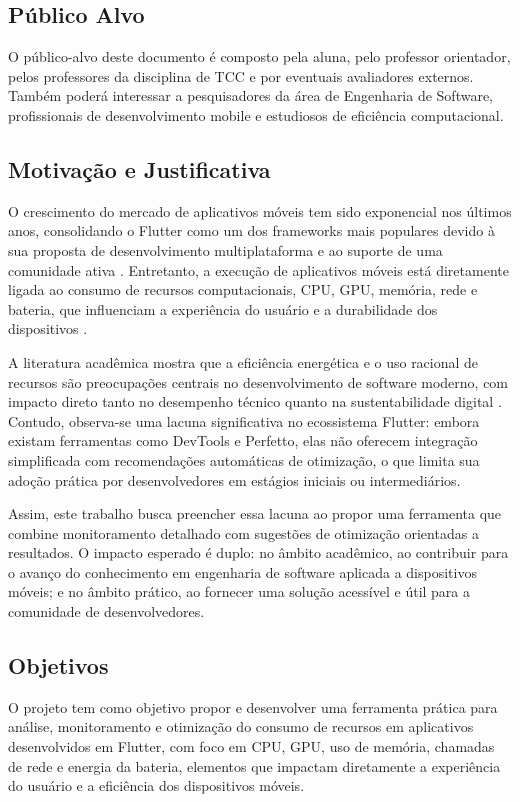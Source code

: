 \documentclass[12pt,a4paper]{article}
\begin{document}
\subsection{Público Alvo}
O público-alvo deste documento é composto pela aluna, pelo professor orientador, pelos professores da disciplina de TCC e por eventuais avaliadores externos. Também poderá interessar a pesquisadores da área de Engenharia de Software, profissionais de desenvolvimento mobile e estudiosos de eficiência computacional.

\subsection{Motivação e Justificativa}
O crescimento do mercado de aplicativos móveis tem sido exponencial nos últimos anos, consolidando o Flutter como um dos frameworks mais populares devido à sua proposta de desenvolvimento multiplataforma e ao suporte de uma comunidade ativa \cite{flutter}. Entretanto, a execução de aplicativos móveis está diretamente ligada ao consumo de recursos computacionais, CPU, GPU, memória, rede e bateria, que influenciam a experiência do usuário e a durabilidade dos dispositivos \cite{energy, monitoring}.  

A literatura acadêmica mostra que a eficiência energética e o uso racional de recursos são preocupações centrais no desenvolvimento de software moderno, com impacto direto tanto no desempenho técnico quanto na sustentabilidade digital \cite{mobile_energy, performance}. Contudo, observa-se uma lacuna significativa no ecossistema Flutter: embora existam ferramentas como DevTools e Perfetto, elas não oferecem integração simplificada com recomendações automáticas de otimização, o que limita sua adoção prática por desenvolvedores em estágios iniciais ou intermediários.  

Assim, este trabalho busca preencher essa lacuna ao propor uma ferramenta que combine monitoramento detalhado com sugestões de otimização orientadas a resultados. O impacto esperado é duplo: no âmbito acadêmico, ao contribuir para o avanço do conhecimento em engenharia de software aplicada a dispositivos móveis; e no âmbito prático, ao fornecer uma solução acessível e útil para a comunidade de desenvolvedores.

\subsection{Objetivos}
O projeto tem como objetivo propor e desenvolver uma ferramenta prática para análise, monitoramento e otimização do consumo de recursos em aplicativos desenvolvidos em Flutter, com foco em CPU, GPU, uso de memória, chamadas de rede e energia da bateria, elementos que impactam diretamente a experiência do usuário e a eficiência dos dispositivos móveis.
\end{document}
